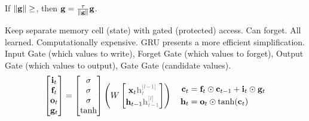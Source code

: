 \begin{definition}
    If \(\norm{\vb{g}} \geq\), then \(\vb{g} = \frac{\tau}{\norm{\vb{g}}} \vb{g}\).
\end{definition}

\begin{definition}[LSTM]
Keep separate memory cell (state) with gated (protected) access. Can forget. All learned. Computationally expensive. GRU presents a more efficient simplification.
Input Gate (which values to write), Forget Gate (which values to forget), Output Gate (which values to output), Gate Gate (candidate values).
\[
\mathbf{
    \begin{bmatrix}
        \mathbf{i}_t \\
        \mathbf{f}_t \\
        \mathbf{o}_t \\
        \mathbf{g}_t
    \end{bmatrix}
} = 
\begin{bmatrix}
    \sigma \\
    \sigma \\
    \sigma \\
    \tanh
\end{bmatrix}
\left( W
\begin{bmatrix}
    \mathbf{x}_t {\color{gray}\h_t\l{l-1}}\\
    \mathbf{h}_{t-1} {\color{gray}\h_{t-1}\l l}
\end{bmatrix}
\right)
\quad
\begin{aligned}
\mathbf{c}_t &= \mathbf{f}_t \odot \mathbf{c}_{t-1} + \mathbf{i}_t \odot \mathbf{g}_t \\
\mathbf{h}_t &= \mathbf{o}_t \odot \tanh(\mathbf{c}_t)
\end{aligned}
\]

\end{definition}
